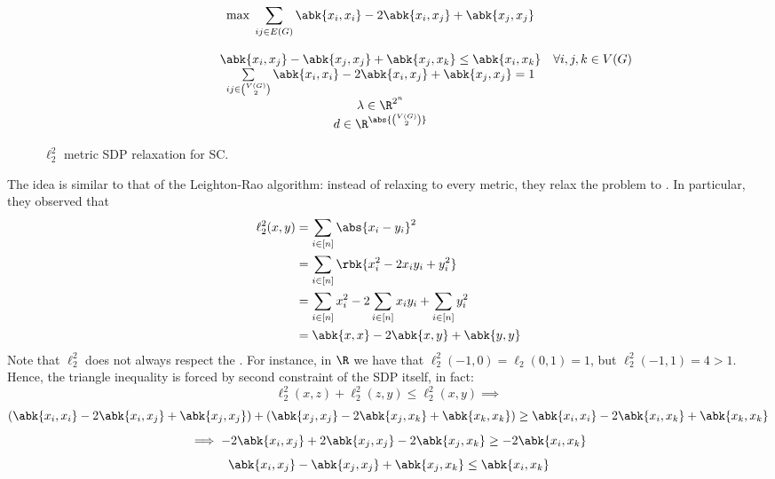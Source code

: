 \documentclass[a4paper, 12pt]{report}
\begin{document}
    \begin{figure}[H]
        \centering
        \[\begin{array}{ccl}
            \qquad\qquad\quad
            & \max \; \displaystyle \sum_{ij \in E(G)}{\abk{x_i,x_i} - 2 \abk{x_i,x_j} + \abk{x_j,x_j}} \\\\
            & \abk{x_i, x_j} - \abk{x_j, x_j} + \abk{x_j, x_k} \le \abk{x_i, x_k} & \forall i, j ,k \in V(G) \\
            & \sum\limits_{ij \in \binom{V(G)}{2}}{\abk{x_i,x_i} - 2 \abk{x_i,x_j} + \abk{x_j,x_j}} = 1 \\
            & \lambda \in \R^{2^n} \\
            & d \in \R^{\abs{\binom{V(G)}{2}}} \\
        \end{array}\]
        \caption{$\ell_2^2$ metric SDP relaxation for SC.}
    \end{figure}

    The idea is similar to that of the Leighton-Rao algorithm: instead of relaxing to every metric, they relax the problem to . In particular, they observed that
    \begin{equation*}
        \begin{split}
            \ell_2^2(x, y) &= \sum_{i \in [n]}{\abs{x_i - y_i}^2} \\
                           &= \sum_{i \in [n]}{\rbk{x_i^2 - 2x_iy_i + y_i^2}} \\
                           &= \sum_{i \in [n]}{x_i^2 - 2\sum_{i \in [n]}{x_iy_i} + \sum_{i \in [n]}{y_i^2}} \\
                           &= \abk{x,x} - 2 \abk{x,y} + \abk{y,y}
        \end{split}
    \end{equation*}
    Note that $\ell_2^2$ does not always respect the . For instance, in $\R$ we have that $\ell_2^2(-1, 0) = \ell_2(0, 1) = 1$, but $\ell_2^2(-1, 1) = 4 > 1$. Hence, the triangle inequality is forced by second constraint of the SDP itself, in fact: $$\ell_2^2(x, z) + \ell_2^2(z, y) \le \ell_2^2(x, y) \implies$$ $$(\abk{x_i, x_i} - 2\abk{x_i, x_j} + \abk{x_j, x_j}) + (\abk{x_j, x_j} - 2\abk{x_j , x_k} + \abk{x_k, x_k}) \ge \abk{x_i, x_i} - 2 \abk{x_i, x_k} + \abk{x_k, x_k}$$ $$\implies -2 \abk{x_i, x_j} + 2\abk{x_j , x_j} - 2 \abk{x_j , x_k } \ge -2 \abk{x_i , x_k}$$ $$\abk{x_i, x_j} - \abk{x_j , x_j} + \abk{x_j , x_k} \le \abk{x_i, x_k}$$
\end{document}
